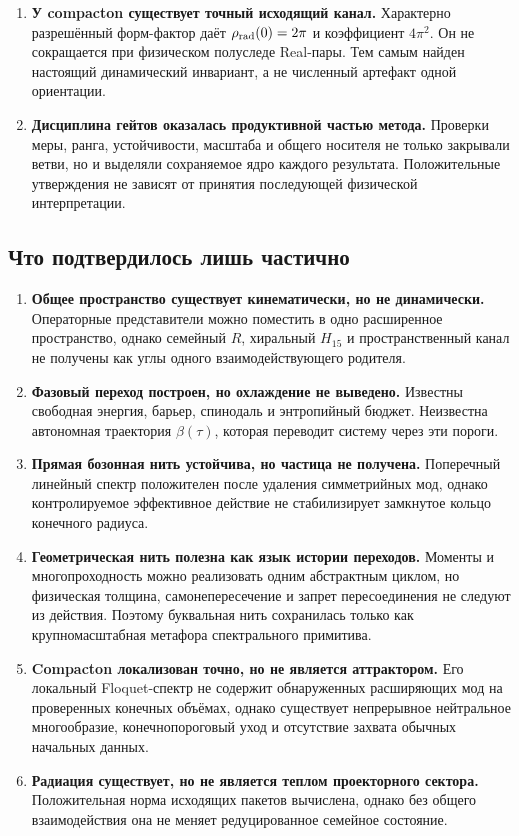 \begin{enumerate}
 \item \textbf{У compacton существует точный исходящий канал.}
 Характерно разрешённый форм-фактор даёт $\rho_{\rm rad}(0)=2\pi$ и
 коэффициент $4\pi^2$. Он не сокращается при физическом полуследе
 Real-пары. Тем самым найден настоящий динамический инвариант, а не
 численный артефакт одной ориентации.

 \item \textbf{Дисциплина гейтов оказалась продуктивной частью метода.}
 Проверки меры, ранга, устойчивости, масштаба и общего носителя не только
 закрывали ветви, но и выделяли сохраняемое ядро каждого результата.
 Положительные утверждения не зависят от принятия последующей физической
 интерпретации.
\end{enumerate}

\subsection{Что подтвердилось лишь частично}

\begin{enumerate}
 \item \textbf{Общее пространство существует кинематически, но не
 динамически.} Операторные представители можно поместить в одно
 расширенное пространство, однако семейный $R$, хиральный $H_{15}$ и
 пространственный канал не получены как углы одного взаимодействующего
 родителя.

 \item \textbf{Фазовый переход построен, но охлаждение не выведено.}
 Известны свободная энергия, барьер, спинодаль и энтропийный бюджет.
 Неизвестна автономная траектория $\beta(\tau)$, которая переводит
 систему через эти пороги.

 \item \textbf{Прямая бозонная нить устойчива, но частица не получена.}
 Поперечный линейный спектр положителен после удаления симметрийных мод,
 однако контролируемое эффективное действие не стабилизирует замкнутое
 кольцо конечного радиуса.

 \item \textbf{Геометрическая нить полезна как язык истории переходов.}
 Моменты и многопроходность можно реализовать одним абстрактным циклом,
 но физическая толщина, самонепересечение и запрет пересоединения не
 следуют из действия. Поэтому буквальная нить сохранилась только как
 крупномасштабная метафора спектрального примитива.

 \item \textbf{Compacton локализован точно, но не является аттрактором.}
 Его локальный Floquet-спектр не содержит обнаруженных расширяющих мод на
 проверенных конечных объёмах, однако существует непрерывное нейтральное
 многообразие, конечнопороговый уход и отсутствие захвата обычных
 начальных данных.

 \item \textbf{Радиация существует, но не является теплом проекторного
 сектора.} Положительная норма исходящих пакетов вычислена, однако без
 общего взаимодействия она не меняет редуцированное семейное состояние.
\end{enumerate}

